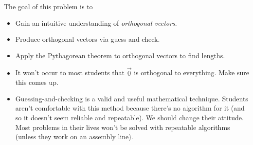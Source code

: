 	\bookonlynewpage

	\question
	\begin{annotation}
		\begin{goals}

			The goal of this problem is to
			\begin{itemize}
				\item Gain an intuitive understanding of \emph{orthogonal vectors}.
				\item Produce orthogonal vectors via guess-and-check.
				\item Apply the Pythagorean theorem to orthogonal vectors to find lengths.
			\end{itemize}
		\end{goals}

		\begin{notes}
			\begin{itemize}
				\item It won't occur to most students that $\vec 0$ is orthogonal to everything. Make sure
					this comes up.
				\item Guessing-and-checking is a valid and useful mathematical technique. Students aren't
					comfortable with this method because there's no algorithm for it (and so it
					doesn't seem reliable and repeatable). We should change their attitude. Most problems
					in their lives won't be solved with repeatable algorithms (unless they work on
					an assembly line).
			\end{itemize}
		\end{notes}
	\end{annotation}
